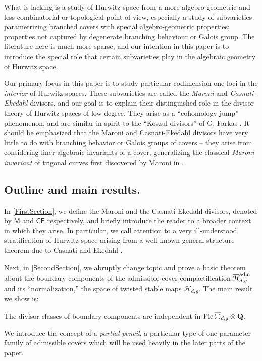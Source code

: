\documentclass[reqno, 10 pt]{article}
\theoremstyle{definition}
\theoremstyle{remark}
\numberwithin{equation}{section}
\numberwithin{thm}{section}
\numberwithin{prop}{section}
\numberwithin{lem}{section}
\numberwithin{cor}{section}
\numberwithin{conj}{section}
\numberwithin{defn}{section}
\renewcommand{\H}{\mathcal H}
\newcommand{\Hdg}{\overline{\H}_{d,g}}
\newcommand{\sfCE}{{\mathsf {CE}}}
\newcommand{\sfM}{{\mathsf M}}
\newcommand {\Q}{{\bf Q}}
\renewcommand{\H}{{\mathcal{H}}}
\newcommand {\Pic}{{\rm Pic}\,}
\begin{document}
What is lacking is a study of Hurwitz space from a more algebro-geometric and less combinatorial or topological point of view, especially a study of subvarieties parametrizing branched covers with special algebro-geometric properties; properties not captured by degenerate branching behaviour or Galois group.  The literature here is much more sparse, and our intention in this paper is to introduce the special role that certain subvarieties play in the algebraic geometry of Hurwitz space. 

Our primary focus in this paper is to study particular codimension one loci in the {\sl interior} of Hurwitz spaces.  These subvarieties are called the {\sl Maroni} and {\sl Casnati-Ekedahl} divisors, and our goal is to explain their distinguished role in the divisor theory of Hurwitz spaces of low degree. They arise as a ``cohomology jump'' phenomenon, and are similar in spirit to the ``Koszul divisors'' of G. Farkas \cite{farkas-koszul}.  It should be emphasized that the Maroni and Casnati-Ekedahl divisors have very little to do with branching behavior or Galois groups of covers -- they arise from considering finer algebraic invariants of a cover, generalizing the classical {\sl Maroni invariant} of trigonal curves first discovered by Maroni in \cite{maroni}.  


\subsection{Outline and main results.}
In \autoref{FirstSection}, we define the Maroni and the Casnati-Ekedahl divisors, denoted by $\sfM$ and $\sfCE$ respectively, and briefly introduce the reader to a broader context in which they arise.  In particular, we call attention to a very ill-understood stratification of Hurwitz space arising from a well-known general structure theorem due to Casnati and Ekedahl \cite{casnati96:_cover_of_algeb_variet_i}. 

Next, in \autoref{SecondSection}, we abruptly change topic and prove a basic theorem about the boundary components of the admissible cover compactification $\Hdg^{\rm adm}$ and its ``normalization,'' the space of twisted stable maps $\Hdg$. The main result we show is: 
\begin{maintheorem}\label{independence} The divisor classes of boundary components are independent in $\Pic \Hdg \otimes \Q$.
\end{maintheorem}  We introduce the concept of a {\sl partial pencil}, a particular type of one parameter family of admissible covers which will be used heavily in the later parts of the paper. 
\end{document}
